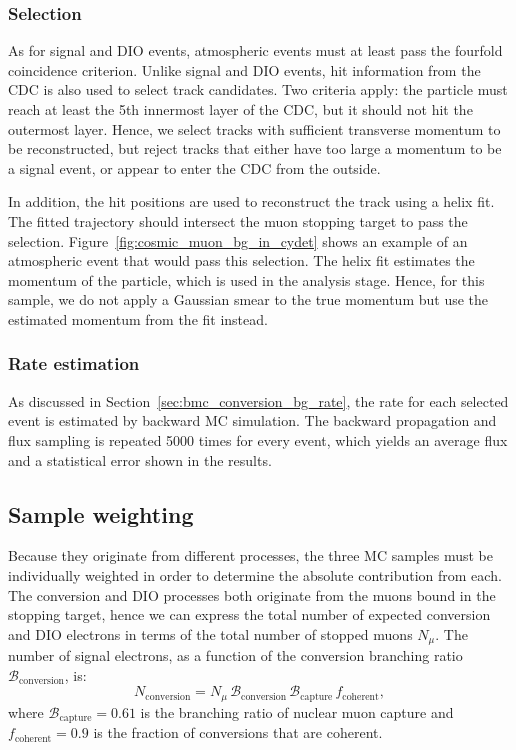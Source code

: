 \subsubsection{Selection}
As for signal and DIO events, atmospheric events must at least pass the fourfold
coincidence criterion. Unlike signal and DIO events, hit information from the
CDC is also used to select track candidates. Two criteria apply: the particle
must reach at least the 5th innermost layer of the CDC, but it should not hit
the outermost layer. Hence, we select tracks with sufficient transverse
momentum to be reconstructed, but reject tracks that either have too large a
momentum to be a signal event, or appear to enter the CDC from the outside. 

In addition, the hit positions are used to reconstruct the track using a helix
fit. The fitted trajectory should intersect the muon stopping target to pass the
selection. Figure~\ref{fig:cosmic_muon_bg_in_cydet} shows an example of an
atmospheric event that would pass this selection. The helix fit estimates the
momentum of the particle, which is used in the analysis stage. Hence, for this
sample, we do not apply a Gaussian smear to the true momentum but use the
estimated momentum from the fit instead.

\subsubsection{Rate estimation}
As discussed in Section~\ref{sec:bmc_conversion_bg_rate}, the rate for each selected
event is estimated by backward MC simulation. The backward propagation and flux
sampling is repeated 5000 times for every event, which yields an average flux
and a statistical error shown in the results.


\subsection{Sample weighting}\label{sec:sample_weighting}

Because they originate from different processes, the three MC samples must be
individually weighted in order to determine the absolute contribution from each.
The conversion and DIO processes both originate from the muons bound in the
stopping target, hence we can express the total number of expected conversion
and DIO electrons in terms of the total number of stopped muons $N_\mu$.
The number of signal electrons, as a function of the conversion branching
ratio $\mathcal{B}_\mathrm{conversion}$, is:
\begin{equation}\label{eq:weight_signal}
N_\mathrm{conversion} = 
N_\mu \, \mathcal{B}_\mathrm{conversion} \, 
\mathcal{B}_\mathrm{capture} \, f_\mathrm{coherent},
\end{equation}
where $\mathcal{B}_\mathrm{capture} = 0.61$ is the branching ratio of nuclear
muon capture and $f_\mathrm{coherent}=0.9$ is the
fraction of conversions that are coherent.

